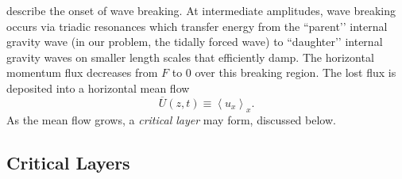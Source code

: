 \documentclass[
        fleqn,
        usenatbib,
        referee,
    ]{mnras}
\newcommand*{\ev}[1]{\left\langle#1\right\rangle}
\begin{document}


\citealp{drazin, klostermeyer, winters1994} describe the onset of wave breaking.
At intermediate amplitudes, wave breaking occurs via triadic resonances which
transfer energy from the ``parent’’ internal gravity wave (in our problem, the
tidally forced wave) to ``daughter’’ internal gravity waves on smaller length
scales that efficiently damp. The horizontal momentum flux decreases from $F$ to
$0$ over this breaking region. The lost flux is deposited into a horizontal mean
flow
\begin{equation}
    \overline{U}(z, t) \equiv \ev{u_x}_x.\label{eq:mean_flow}
\end{equation}
As the mean flow grows, a \emph{critical layer} may form, discussed below.

\subsection{Critical Layers}\label{ss:crit_layer}
\end{document}
